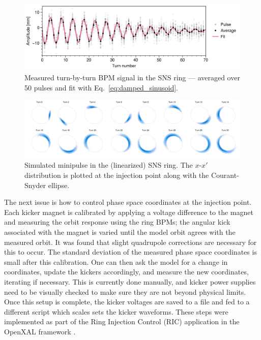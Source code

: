 %
\begin{figure}[!p]
    \centering
    \includegraphics[width=\textwidth]{Images/chapter1/bpm_avg.png}
    \caption{Measured turn-by-turn BPM signal in the SNS ring — averaged over 50 pulses and fit with Eq.~\eqref{eq:damped_sinusoid}.}
    \label{fig:bpm_avg}
\end{figure}
%
%
\begin{figure}
    \centering
    \includegraphics[width=\textwidth]{Images/chapter1/minipulse_chromaticity.png}
    \caption{Simulated minipulse in the (linearized) SNS ring. The $x$-$x'$ distribution is plotted at the injection point along with the Courant-Snyder ellipse.}
    \label{fig:minipulse}
\end{figure}
%

The next issue is how to control phase space coordinates at the injection point. Each kicker magnet is calibrated by applying a voltage difference to the magnet and measuring the orbit response using the ring BPMs; the angular kick associated with the magnet is varied until the model orbit agrees with the measured orbit. It was found that slight quadrupole corrections are necessary for this to occur. The standard deviation of the measured phase space coordinates is small after this calibration. One can then ask the model for a change in coordinates, update the kickers accordingly, and measure the new coordinates, iterating if necessary. This is currently done manually, and kicker power supplies need to be visually checked to make sure they are not beyond physical limits. Once this setup is complete, the kicker voltages are saved to a file and fed to a different script which scales sets the kicker waveforms. These steps were implemented as part of the Ring Injection Control (RIC) application in the OpenXAL framework \cite{Milas2021}. 

